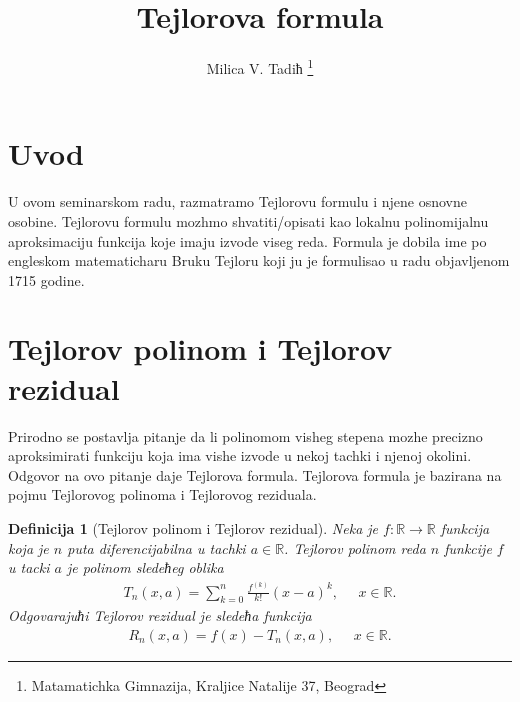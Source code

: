 \documentclass[12pt,a4paper]{article}
\newtheorem{defi}{Definicija}%
\begin{document}
\title{Tejlorova formula} 

\author{Milica V. Tadiћ
\thanks{Matamatichka Gimnazija, Kraljice Natalije 37, Beograd }}

\date{}

\maketitle

\section{Uvod} \label{section0}

U ovom seminarskom radu, razmatramo Tejlorovu formulu i njene osnovne osobine. 
Tejlorovu formulu mozhmo shvatiti/opisati kao 
lokalnu polinomijalnu aproksimaciju funkcija koje imaju izvode viseg reda. 
Formula je dobila ime po engleskom matematicharu 
Bruku Tejloru koji ju je formulisao u radu objavljenom 1715 godine. 

 
 

\section{Tejlorov polinom i Tejlorov rezidual}

Prirodno se postavlja pitanje 
da li polinomom visheg stepena mozhe precizno 
aproksimirati 
funkciju koja ima vishe izvode u nekoj tachki i njenoj
okolini. 
Odgovor na ovo pitanje daje
Tejlorova formula. 
Tejlorova formula je bazirana 
na pojmu Tejlorovog polinoma i Tejlorovog reziduala. 


\begin{defi}[Tejlorov polinom i Tejlorov rezidual]
Neka je $f:\mathbb{R}\rightarrow\mathbb{R}$ funkcija 
koja je $n$ puta diferencijabilna u tachki $a\in\mathbb{R}$. 
Tejlorov polinom reda $n$ funkcije $f$ u tacki $a$ je 
polinom sledeћeg oblika 
\begin{align*}
    T_{n}(x,a)
    =
    \sum_{k=0}^{n}\frac{f^{(k)}}{k!}(x-a)^{k}, 
    \;\;\;\;\; x\in\mathbb{R}. 
\end{align*}
Odgovarajuћi Tejlorov rezidual je sledeћa funkcija
\begin{align*}
    R_{n}(x,a)
    =
    f(x)-T_{n}(x,a), 
    \;\;\;\;\; x\in\mathbb{R}. 
\end{align*}
\end{defi}
\end{document}
